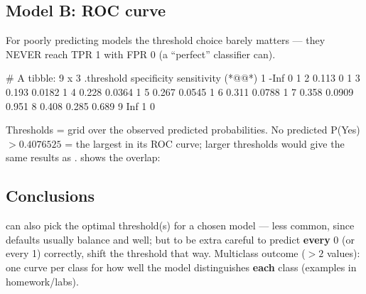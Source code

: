 \subsection{Model B: ROC curve}
For poorly predicting models the threshold choice barely matters --- they NEVER reach TPR 1 with
FPR 0 (a ``perfect'' classifier can).
\begin{routput}
# A tibble: 9 x 3
  .threshold specificity sensitivity      (*@@*)
1   -Inf          0            1
2      0.113      0            1
3      0.193      0.0182       1
4      0.228      0.0364       1
5      0.267      0.0545       1
6      0.311      0.0788       1
7      0.358      0.0909       0.951
8      0.408      0.285        0.689
9    Inf          1            0
\end{routput}
Thresholds = grid over the observed predicted probabilities. No predicted P(Yes) $>0.4076525$ = the largest 
in its ROC curve; larger thresholds would give the same results as .  shows the overlap:

\subsection{Conclusions}
%
 can also pick the optimal threshold(s) for a chosen model --- less common, since defaults
usually balance  and  well; but to be extra careful to predict \textbf{every} 0 (or every 1)
correctly, shift the threshold that way. Multiclass outcome ($>2$ values): one curve per
class for how well the model distinguishes \textbf{each} class (examples in homework/labs).
